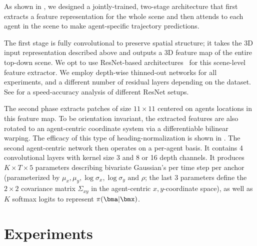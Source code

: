 \documentclass{article}
\newcommand{\out}[1]{}
\newcommand{\supsecref}[1]{\secref{#1}}
\begin{document}
As shown in , we designed a jointly-trained, two-stage architecture that first extracts a feature representation for the whole scene and then attends to each agent in the scene to make agent-specific trajectory predictions. 

The first stage is fully convolutional to preserve spatial structure; it takes the 3D input representation described above and outputs a 3D feature map of the entire top-down scene. We opt to use ResNet-based architectures~\cite{He16} for this scene-level feature extractor. We employ depth-wise thinned-out networks for all experiments, and a different number of residual layers depending on the dataset. See \supsecref{sec:backbone} for a speed-accuracy analysis of different ResNet setups.

The second phase extracts patches of size $11\times11$ centered on agents locations in this feature map. To be orientation invariant, the extracted features are also rotated to an agent-centric coordinate system via a differentiable bilinear warping. The efficacy of this type of heading-normalization is shown in \supsecref{sec:normalizaton}. The second agent-centric network then operates on a per-agent basis. It contains 4 convolutional layers with kernel size 3 and 8 or 16 depth channels. It produces $K \times T \times 5$ parameters describing bivariate Gaussian's per time step per anchor (parameterized by $\mu_x, \mu_y, \log\sigma_x , \log\sigma_y \text{ and } \rho$; the last 3 parameters define the $2\times2$ covariance matrix $\Sigma_{xy}$ in the agent-centric $x,y$-coordinate space), as well as $K$ softmax logits to represent $\pi(\bma|\bmx)$.
\out{
NOTE(bensapp): these are implementation details specific to a particular dataset and should be in the experimental implementation details section, or supplement:

The first scene-level feature extractor is a thinned-out ResNet50 \cite{He16}, with the number of channels reduced to 12.5\% of the default values (also known as using a depth multiplier of 12.5\%). We then extract agent-specific feature patches of size 11px$\times$11px from the scene-level feature map. The patch feature is centered at the agent’s position and rotated according to the agent’s heading. We apply a second CNN on the cropped patch features. This agent-level feature extractor consists of 4 convolutional layers with kernel size 3 each. The depth and stride are, 16/2, 8/2, 16/1, 16/1, respectively.
} \section{Experiments} \label{sec:experiments}
\end{document}
